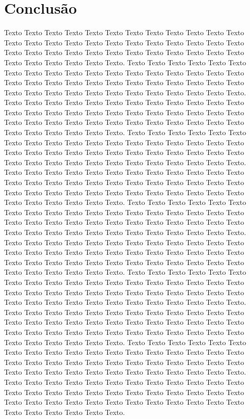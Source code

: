 \chapter{Conclusão}
\paragrafo{}
Texto Texto Texto Texto Texto Texto Texto Texto Texto Texto Texto Texto Texto Texto Texto Texto Texto Texto Texto Texto Texto Texto Texto Texto Texto Texto Texto Texto Texto Texto Texto Texto Texto Texto Texto Texto Texto Texto Texto Texto Texto Texto.
\paragrafo{}
Texto Texto Texto Texto Texto Texto Texto Texto Texto Texto Texto Texto Texto Texto Texto Texto Texto Texto Texto Texto Texto Texto Texto Texto Texto Texto Texto Texto Texto Texto Texto Texto Texto Texto Texto Texto Texto Texto Texto Texto Texto Texto.
\paragrafo{}
Texto Texto Texto Texto Texto Texto Texto Texto Texto Texto Texto Texto Texto Texto Texto Texto Texto Texto Texto Texto Texto Texto Texto Texto Texto Texto Texto Texto Texto Texto Texto Texto Texto Texto Texto Texto Texto Texto Texto Texto Texto Texto.
\paragrafo{}
Texto Texto Texto Texto Texto Texto Texto Texto Texto Texto Texto Texto Texto Texto Texto Texto Texto Texto Texto Texto Texto Texto Texto Texto Texto Texto Texto Texto Texto Texto Texto Texto Texto Texto Texto Texto Texto Texto Texto Texto Texto Texto.
\paragrafo{}
Texto Texto Texto Texto Texto Texto Texto Texto Texto Texto Texto Texto Texto Texto Texto Texto Texto Texto Texto Texto Texto Texto Texto Texto Texto Texto Texto Texto Texto Texto Texto Texto Texto Texto Texto Texto Texto Texto Texto Texto Texto Texto.
\paragrafo{}
Texto Texto Texto Texto Texto Texto Texto Texto Texto Texto Texto Texto Texto Texto Texto Texto Texto Texto Texto Texto Texto Texto Texto Texto Texto Texto Texto Texto Texto Texto Texto Texto Texto Texto Texto Texto Texto Texto Texto Texto Texto Texto.
\paragrafo{}
Texto Texto Texto Texto Texto Texto Texto Texto Texto Texto Texto Texto Texto Texto Texto Texto Texto Texto Texto Texto Texto Texto Texto Texto Texto Texto Texto Texto Texto Texto Texto Texto Texto Texto Texto Texto Texto Texto Texto Texto Texto Texto.
\paragrafo{}
Texto Texto Texto Texto Texto Texto Texto Texto Texto Texto Texto Texto Texto Texto Texto Texto Texto Texto Texto Texto Texto Texto Texto Texto Texto Texto Texto Texto Texto Texto Texto Texto Texto Texto Texto Texto Texto Texto Texto Texto Texto Texto.
\paragrafo{}
Texto Texto Texto Texto Texto Texto Texto Texto Texto Texto Texto Texto Texto Texto Texto Texto Texto Texto Texto Texto Texto Texto Texto Texto Texto Texto Texto Texto Texto Texto Texto Texto Texto Texto Texto Texto Texto Texto Texto Texto Texto Texto.
\paragrafo{}
Texto Texto Texto Texto Texto Texto Texto Texto Texto Texto Texto Texto Texto Texto Texto Texto Texto Texto Texto Texto Texto Texto Texto Texto Texto Texto Texto Texto Texto Texto Texto Texto Texto Texto Texto Texto Texto Texto Texto Texto Texto Texto.
\paragrafo{}
Texto Texto Texto Texto Texto Texto Texto Texto Texto Texto Texto Texto Texto Texto Texto Texto Texto Texto Texto Texto Texto Texto Texto Texto Texto Texto Texto Texto Texto Texto Texto Texto Texto Texto Texto Texto Texto Texto Texto Texto Texto Texto.